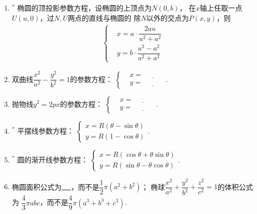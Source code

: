 \documentclass{article}
\newif\ifte
\begin{document}
\begin{multicols}{2}
\begin{enumerate}[leftmargin=20pt]
\item $^*$ 椭圆的顶投影参数方程，设椭圆的上顶点为$ N(0,b) $，
在$ x $轴上任取一点$ U(u,0) $，过$ N,U $两点的直线与椭圆的
除$ N $以外的交点为$ P(x,y) $，则
\begin{gather*}
    \left\{
    \begin{aligned} 
        & x=a\cdot\dfrac{2au}{u^2+a^2} \\
        & y=b\cdot\dfrac{u^2-a^2}{u^2+a^2}
    \end{aligned}
    \right.
\end{gather*}

\item 双曲线$ \dfrac{x^2}{a^2}-\dfrac{y^2}{b^2}=1 $的参数方程：
$ \left\{ \begin{aligned}
    &x=\underline{\ \ifte \dfrac{a}{\cos \theta}\else \hspace{1cm} \fi\ }  \\
    &y=\underline{\ \ifte b\tan\theta\else \hspace{1cm} \fi\ }
\end{aligned} \right.  $.

\item 抛物线$ y^2=2px $的参数方程：
$ \left\{ \begin{aligned}
    &x=\underline{\ \ifte 2pt^2\else \hspace{1cm} \fi\ } \\
    &y=\underline{\ \ifte 2pt\else \hspace{1cm} \fi\ }
\end{aligned} \right.  $. 

\item $^*$ 平摆线参数方程：
$ \begin{cases}
    x=R(\theta-\sin\theta) \\
    y=R(1-\cos\theta)
\end{cases}  $.

\item $^*$ 圆的渐开线参数方程：
$ \begin{cases}
    x=R(\cos\theta+\theta\sin\theta) \\
    y=R(\sin\theta-\theta\cos\theta)
\end{cases} $.

\item 椭圆面积公式为\underline{\ \ifte $ \pi ab $
    \else \hspace{1cm} \fi\ }，而不是$ \dfrac{1}{2}\pi(a^2+b^2) $；
椭球$ \dfrac{x^2}{a^2}+\dfrac{y^2}{b^2}+\dfrac{z^2}{c^2}=1 $的体积公式为
$ \dfrac{4}{3}\pi abc $，而不是$ \dfrac{4}{9}\pi (a^3+b^3+c^3) $.


\end{enumerate}
\end{multicols}
\end{document}
